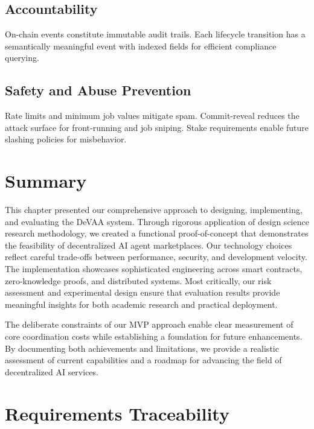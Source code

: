 \subsection{Accountability}
On-chain events constitute immutable audit trails. Each lifecycle transition has a semantically meaningful event with indexed fields for efficient compliance querying.

\subsection{Safety and Abuse Prevention}
Rate limits and minimum job values mitigate spam. Commit-reveal reduces the attack surface for front-running and job sniping. Stake requirements enable future slashing policies for misbehavior.

\section{Summary}

This chapter presented our comprehensive approach to designing, implementing, and evaluating the DeVAA system. Through rigorous application of design science research methodology, we created a functional proof-of-concept that demonstrates the feasibility of decentralized AI agent marketplaces. Our technology choices reflect careful trade-offs between performance, security, and development velocity. The implementation showcases sophisticated engineering across smart contracts, zero-knowledge proofs, and distributed systems. Most critically, our risk assessment and experimental design ensure that evaluation results provide meaningful insights for both academic research and practical deployment.

The deliberate constraints of our MVP approach enable clear measurement of core coordination costs while establishing a foundation for future enhancements. By documenting both achievements and limitations, we provide a realistic assessment of current capabilities and a roadmap for advancing the field of decentralized AI services.

\section{Requirements Traceability}

